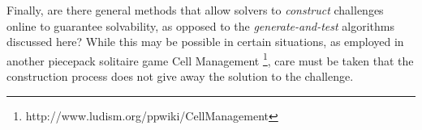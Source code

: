\documentclass[10pt,journal,compsoc]{IEEEtran}
\begin{document}
Finally, are there general methods that allow solvers to {\it construct} challenges online to guarantee solvability, as opposed to the {\it generate-and-test} algorithms discussed here? While this may be possible in certain situations, as employed in another piecepack solitaire game Cell Management \footnote{http://www.ludism.org/ppwiki/CellManagement}, care must be taken that the construction process does not give away the solution to the challenge.






%
%

\end{document}
